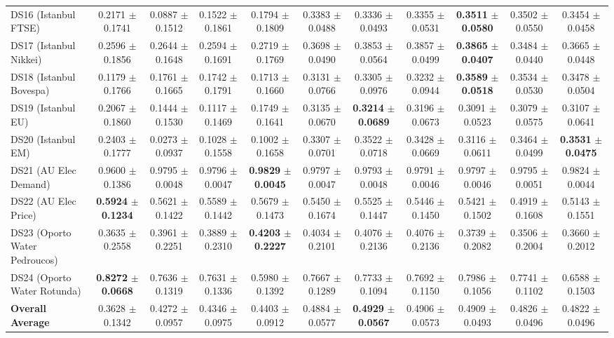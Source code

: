 \begin{table}[t]
{{\begin{tabular}{lcccccccccc}
DS16 (Istanbul FTSE) & 0.2171 $\pm$ 0.1741 & 0.0887 $\pm$ 0.1512 & 0.1522 $\pm$ 0.1861 & 0.1794 $\pm$ 0.1809 & 0.3383 $\pm$ 0.0488 & 0.3336 $\pm$ 0.0493 & 0.3355 $\pm$ 0.0531 & \textbf{0.3511} $\pm$ \textbf{0.0580} & 0.3502 $\pm$ 0.0550 & 0.3454 $\pm$ 0.0458 \\
DS17 (Istanbul Nikkei) & 0.2596 $\pm$ 0.1856 & 0.2644 $\pm$ 0.1648 & 0.2594 $\pm$ 0.1691 & 0.2719 $\pm$ 0.1769 & 0.3698 $\pm$ 0.0490 & 0.3853 $\pm$ 0.0564 & 0.3857 $\pm$ 0.0499 & \textbf{0.3865} $\pm$ \textbf{0.0407} & 0.3484 $\pm$ 0.0440 & 0.3665 $\pm$ 0.0448 \\
DS18 (Istanbul Bovespa) & 0.1179 $\pm$ 0.1766 & 0.1761 $\pm$ 0.1665 & 0.1742 $\pm$ 0.1791 & 0.1713 $\pm$ 0.1660 & 0.3131 $\pm$ 0.0766 & 0.3305 $\pm$ 0.0976 & 0.3232 $\pm$ 0.0944 & \textbf{0.3589} $\pm$ \textbf{0.0518} & 0.3534 $\pm$ 0.0530 & 0.3478 $\pm$ 0.0504 \\
DS19 (Istanbul EU) & 0.2067 $\pm$ 0.1860 & 0.1444 $\pm$ 0.1530 & 0.1117 $\pm$ 0.1469 & 0.1749 $\pm$ 0.1641 & 0.3135 $\pm$ 0.0670 & \textbf{0.3214} $\pm$ \textbf{0.0689} & 0.3196 $\pm$ 0.0673 & 0.3091 $\pm$ 0.0523 & 0.3079 $\pm$ 0.0575 & 0.3107 $\pm$ 0.0641 \\
DS20 (Istanbul EM) & 0.2403 $\pm$ 0.1777 & 0.0273 $\pm$ 0.0937 & 0.1028 $\pm$ 0.1558 & 0.1002 $\pm$ 0.1658 & 0.3307 $\pm$ 0.0701 & 0.3522 $\pm$ 0.0718 & 0.3428 $\pm$ 0.0669 & 0.3116 $\pm$ 0.0611 & 0.3464 $\pm$ 0.0499 & \textbf{0.3531} $\pm$ \textbf{0.0475} \\
DS21 (AU Elec Demand) & 0.9600 $\pm$ 0.1386 & 0.9795 $\pm$ 0.0048 & 0.9796 $\pm$ 0.0047 & \textbf{0.9829} $\pm$ \textbf{0.0045} & 0.9797 $\pm$ 0.0047 & 0.9793 $\pm$ 0.0048 & 0.9791 $\pm$ 0.0046 & 0.9797 $\pm$ 0.0046 & 0.9795 $\pm$ 0.0051 & 0.9824 $\pm$ 0.0044 \\
DS22 (AU Elec Price) & \textbf{0.5924} $\pm$ \textbf{0.1234} & 0.5621 $\pm$ 0.1422 & 0.5589 $\pm$ 0.1442 & 0.5679 $\pm$ 0.1473 & 0.5450 $\pm$ 0.1674 & 0.5525 $\pm$ 0.1447 & 0.5446 $\pm$ 0.1450 & 0.5421 $\pm$ 0.1502 & 0.4919 $\pm$ 0.1608 & 0.5143 $\pm$ 0.1551 \\
DS23 (Oporto Water Pedroucos) & 0.3635 $\pm$ 0.2558 & 0.3961 $\pm$ 0.2251 & 0.3889 $\pm$ 0.2310 & \textbf{0.4203} $\pm$ \textbf{0.2227} & 0.4034 $\pm$ 0.2101 & 0.4076 $\pm$ 0.2136 & 0.4076 $\pm$ 0.2136 & 0.3739 $\pm$ 0.2082 & 0.3506 $\pm$ 0.2004 & 0.3660 $\pm$ 0.2012 \\
DS24 (Oporto Water Rotunda) & \textbf{0.8272} $\pm$ \textbf{0.0668} & 0.7636 $\pm$ 0.1319 & 0.7631 $\pm$ 0.1336 & 0.5980 $\pm$ 0.1392 & 0.7667 $\pm$ 0.1289 & 0.7733 $\pm$ 0.1094 & 0.7692 $\pm$ 0.1150 & 0.7986 $\pm$ 0.1056 & 0.7741 $\pm$ 0.1102 & 0.6588 $\pm$ 0.1503 \\
\midrule
\textbf{Overall Average} & 0.3628 $\pm$ 0.1342 & 0.4272 $\pm$ 0.0957 & 0.4346 $\pm$ 0.0975 & 0.4403 $\pm$ 0.0912 & 0.4884 $\pm$ 0.0577 & \textbf{0.4929} $\pm$ \textbf{0.0567} & 0.4906 $\pm$ 0.0573 & 0.4909 $\pm$ 0.0493 & 0.4826 $\pm$ 0.0496 & 0.4822 $\pm$ 0.0496 \\
\bottomrule
\end{tabular}%
}%
}
\end{table}
